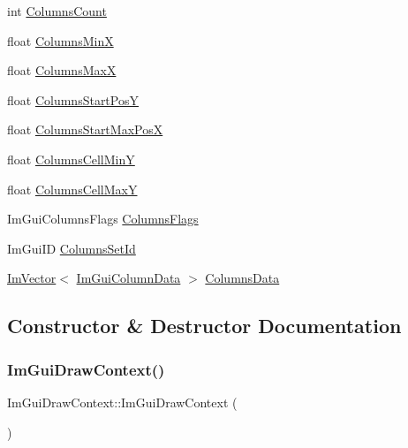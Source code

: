 \begin{DoxyCompactItemize}
int \hyperlink{struct_im_gui_draw_context_ab068622174203ba86e835980cad066b6}{Columns\+Count}
\item 
float \hyperlink{struct_im_gui_draw_context_ad86d60b4523f423749d944ba56902c83}{Columns\+MinX}
\item 
float \hyperlink{struct_im_gui_draw_context_aa6b05d0a845896193dff628b02f71ba0}{Columns\+MaxX}
\item 
float \hyperlink{struct_im_gui_draw_context_adc5c108aa693534f656018ca095dd2ee}{Columns\+Start\+PosY}
\item 
float \hyperlink{struct_im_gui_draw_context_af1fd970d3806165e93870172231bb1b8}{Columns\+Start\+Max\+PosX}
\item 
float \hyperlink{struct_im_gui_draw_context_a675eb10cf0c56322f8e9a6c40e33a7ea}{Columns\+Cell\+MinY}
\item 
float \hyperlink{struct_im_gui_draw_context_a91c90b98539dc2b1522dd3f7bafa3b21}{Columns\+Cell\+MaxY}
\item 
Im\+Gui\+Columns\+Flags \hyperlink{struct_im_gui_draw_context_acd823cd056a5922a9f3a7c8844451ea7}{Columns\+Flags}
\item 
Im\+Gui\+ID \hyperlink{struct_im_gui_draw_context_a7bb2cdab76e2b7cc12af2c87eeaafc0a}{Columns\+Set\+Id}
\item 
\hyperlink{class_im_vector}{Im\+Vector}$<$ \hyperlink{struct_im_gui_column_data}{Im\+Gui\+Column\+Data} $>$ \hyperlink{struct_im_gui_draw_context_ae0f7e8f70065e8ddc45d62cf33195a0f}{Columns\+Data}
\end{DoxyCompactItemize}


\subsection{Constructor \& Destructor Documentation}
\hypertarget{struct_im_gui_draw_context_a0bd8a456860aee49497c58c82a01600c}{}\label{struct_im_gui_draw_context_a0bd8a456860aee49497c58c82a01600c} 
\subsubsection{\texorpdfstring{Im\+Gui\+Draw\+Context()}{ImGuiDrawContext()}}
{\footnotesize\ttfamily Im\+Gui\+Draw\+Context\+::\+Im\+Gui\+Draw\+Context (\begin{DoxyParamCaption}{ }\end{DoxyParamCaption})}



